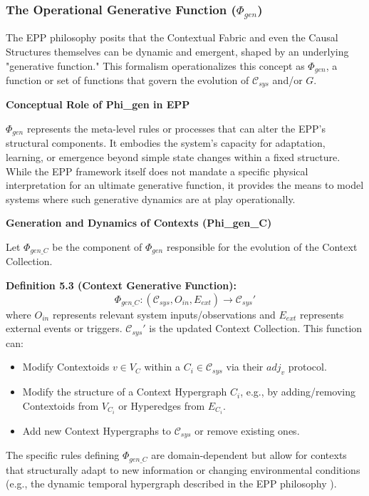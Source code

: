 \subsubsection[The Operational Generative Function (Phi\_gen)]{The Operational Generative Function (\(\Phi_{gen}\))}
\label{ssec:generative_function_formal_merged} %

The EPP philosophy posits that the Contextual Fabric and even the Causal Structures themselves can be dynamic and emergent, shaped by an underlying "generative function." This formalism operationalizes this concept as \(\Phi_{gen}\), a function or set of functions that govern the evolution of \(\mathcal{C}_{sys}\) and/or \(G\).


\textbf{Conceptual Role of Phi\_gen in EPP}


\(\Phi_{gen}\) represents the meta-level rules or processes that can alter the EPP's structural components. It embodies the system's capacity for adaptation, learning, or emergence beyond simple state changes within a fixed structure. While the EPP framework itself does not mandate a specific physical interpretation for an ultimate generative function, it provides the means to model systems where such generative dynamics are at play operationally.


\textbf{Generation and Dynamics of Contexts (Phi\_gen\_C)}


Let \(\Phi_{gen\_C}\) be the component of \(\Phi_{gen}\) responsible for the evolution of the Context Collection.

\textbf{Definition 5.3 (Context Generative Function):}
\[ \Phi_{gen\_C} : (\mathcal{C}_{sys}, O_{in}, E_{ext}) \to \mathcal{C}_{sys}' \]
where \(O_{in}\) represents relevant system inputs/observations and \(E_{ext}\) represents external events or triggers. \(\mathcal{C}_{sys}'\) is the updated Context Collection.
This function can:
\begin{itemize}
    \item Modify Contextoids \(v \in V_C\) within a \(C_i \in \mathcal{C}_{sys}\) via their \(adj_v\) protocol.
    \item Modify the structure of a Context Hypergraph \(C_i\), e.g., by adding/removing Contextoids from \(V_{C_i}\) or Hyperedges from \(E_{C_i}\).
    \item Add new Context Hypergraphs to \(\mathcal{C}_{sys}\) or remove existing ones.
\end{itemize}
The specific rules defining \(\Phi_{gen\_C}\) are domain-dependent but allow for contexts that structurally adapt to new information or changing environmental conditions (e.g., the dynamic temporal hypergraph described in the EPP philosophy \cite{Hansen2025EPP}).


